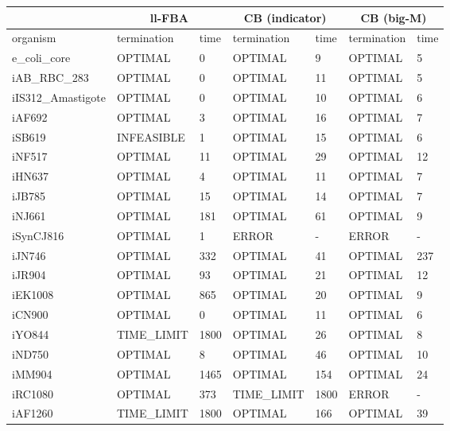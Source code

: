 \begin{table}[!ht]
    \small
    \centering
    \begin{tabular}{|l|l|l|l|l|l|l|}
    \hline
        \multicolumn{1}{|c}{} & \multicolumn{2}{|c|}{ll-FBA} & \multicolumn{2}{|c|}{CB (indicator)} & \multicolumn{2}{c|}{CB (big-M)}\\ \hline 
        organism & termination & time & termination & time & termination & time \\ \hline
        e\_coli\_core & OPTIMAL & 0 & OPTIMAL & 9 & OPTIMAL & 5 \\ \hline
        iAB\_RBC\_283 & OPTIMAL & 0 & OPTIMAL & 11 & OPTIMAL & 5 \\ \hline
        iIS312\_Amastigote & OPTIMAL & 0 & OPTIMAL & 10 & OPTIMAL & 6 \\ \hline
        iAF692 & OPTIMAL & 3 & OPTIMAL & 16 & OPTIMAL & 7 \\ \hline
        iSB619 & INFEASIBLE & 1 & OPTIMAL & 15 & OPTIMAL & 6 \\ \hline
        iNF517 & OPTIMAL & 11 & OPTIMAL & 29 & OPTIMAL & 12 \\ \hline
        iHN637 & OPTIMAL & 4 & OPTIMAL & 11 & OPTIMAL & 7 \\ \hline
        iJB785 & OPTIMAL & 15 & OPTIMAL & 14 & OPTIMAL & 7 \\ \hline
        iNJ661 & OPTIMAL & 181 & OPTIMAL & 61 & OPTIMAL & 9 \\ \hline
        iSynCJ816 & OPTIMAL & 1 & ERROR & - & ERROR & - \\ \hline
        iJN746 & OPTIMAL & 332 & OPTIMAL & 41 & OPTIMAL & 237 \\ \hline
        iJR904 & OPTIMAL & 93 & OPTIMAL & 21 & OPTIMAL & 12 \\ \hline
        iEK1008 & OPTIMAL & 865 & OPTIMAL & 20 & OPTIMAL & 9 \\ \hline
        iCN900 & OPTIMAL & 0 & OPTIMAL & 11 & OPTIMAL & 6 \\ \hline
        iYO844 & TIME\_LIMIT & 1800 & OPTIMAL & 26 & OPTIMAL & 8 \\ \hline
        iND750 & OPTIMAL & 8 & OPTIMAL & 46 & OPTIMAL & 10 \\ \hline
        iMM904 & OPTIMAL & 1465 & OPTIMAL & 154 & OPTIMAL & 24 \\ \hline
        iRC1080 & OPTIMAL & 373 & TIME\_LIMIT & 1800 & ERROR & - \\ \hline
        iAF1260 & TIME\_LIMIT & 1800 & OPTIMAL & 166 & OPTIMAL & 39 \\ \hline

\end{tabular}
\end{table}
